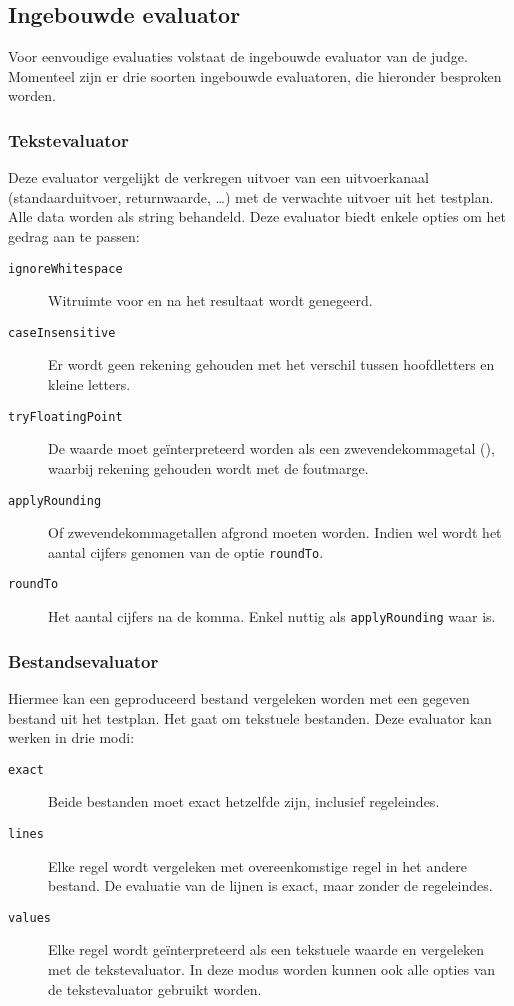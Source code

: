 \subsection{Ingebouwde evaluator}\label{subsec:ingebouwde-evaluator}

Voor eenvoudige evaluaties volstaat de ingebouwde evaluator van de judge.
Momenteel zijn er drie soorten ingebouwde evaluatoren, die hieronder besproken worden.

\subsubsection{Tekstevaluator}

Deze evaluator vergelijkt de verkregen uitvoer van een uitvoerkanaal (standaarduitvoer, returnwaarde, \ldots) met de verwachte uitvoer uit het testplan.
Alle data worden als string behandeld.
Deze evaluator biedt enkele opties om het gedrag aan te passen:

\begin{description}
    \item[\texttt{ignoreWhitespace}] Witruimte voor en na het resultaat wordt genegeerd.
    \item[\texttt{caseInsensitive}] Er wordt geen rekening gehouden met het verschil tussen hoofdletters en kleine letters.
    \item[\texttt{tryFloatingPoint}] De waarde moet geïnterpreteerd worden als een zwevendekommagetal (), waarbij rekening gehouden wordt met de foutmarge.
    \item[\texttt{applyRounding}] Of zwevendekommagetallen afgrond moeten worden.
    Indien wel wordt het aantal cijfers genomen van de optie \texttt{roundTo}.
    \item[\texttt{roundTo}] Het aantal cijfers na de komma.
    Enkel nuttig als \texttt{applyRounding} waar is.
\end{description}

\subsubsection{Bestandsevaluator}

Hiermee kan een geproduceerd bestand vergeleken worden met een gegeven bestand uit het testplan.
Het gaat om tekstuele bestanden.
Deze evaluator kan werken in drie modi:

\begin{description}
    \item[\texttt{exact}] Beide bestanden moet exact hetzelfde zijn, inclusief regeleindes.
    \item[\texttt{lines}] Elke regel wordt vergeleken met overeenkomstige regel in het andere bestand.
    De evaluatie van de lijnen is exact, maar zonder de regeleindes.
    \item[\texttt{values}] Elke regel wordt geïnterpreteerd als een tekstuele waarde en vergeleken met de tekstevaluator.
    In deze modus worden kunnen ook alle opties van de tekstevaluator gebruikt worden.
\end{description}

